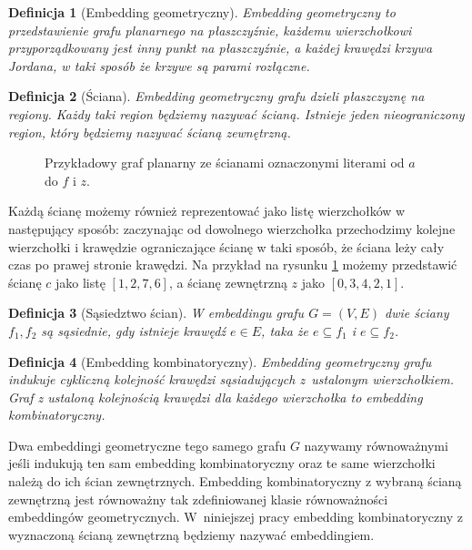 \documentclass[twoside,a4paper,12pt]{report} %
\theoremstyle{break}
\newtheorem{definition}{Definicja}[section]
\begin{document}
\begin{definition}[Embedding geometryczny]
\emph{Embedding geometryczny} to przedstawienie grafu planarnego na płaszczyźnie, każdemu wierzchołkowi przyporządkowany jest inny punkt na płaszczyźnie, a każdej krawędzi krzywa Jordana, w taki sposób że krzywe są parami rozłączne.
\end{definition}

\begin{definition}[Ściana]
Embedding geometryczny grafu dzieli płaszczyznę na regiony. Każdy taki region będziemy nazywać \emph{ścianą}. Istnieje jeden nieograniczony region, który będziemy nazywać ścianą zewnętrzną.
\end{definition}

\begin{figure}[ht]
\begin{center}
    
\end{center}
\caption{Przykładowy graf planarny ze ścianami oznaczonymi literami od $a$ do $f$ i $z$.}
\label{sciany}
\end{figure}

Każdą ścianę możemy również reprezentować jako listę wierzchołków w następujący sposób: zaczynając od dowolnego wierzchołka przechodzimy kolejne wierzchołki i krawędzie ograniczające ścianę w taki sposób, że ściana leży cały czas po prawej stronie krawędzi. Na przykład na rysunku \ref{sciany} możemy przedstawić ścianę $c$ jako listę $[1,2,7,6]$, a ścianę zewnętrzną $z$ jako $[0,3,4,2,1]$.

\begin{definition}[Sąsiedztwo ścian]
W embeddingu grafu $G=(V,E)$ dwie ściany $f_1, f_2$ są \emph{sąsiednie}, gdy istnieje krawędź $e \in E$, taka że $e \subseteq f_1$ i $e \subseteq f_2$. 
\end{definition}

\begin{definition}[Embedding kombinatoryczny]
Embedding geometryczny grafu indukuje cykliczną kolejność krawędzi sąsiadujących z~ustalonym wierzchołkiem. Graf z ustaloną kolejnością krawędzi dla każdego wierzchołka to \emph{embedding kombinatoryczny}.
\end{definition}

Dwa embeddingi geometryczne tego samego grafu $G$ nazywamy równoważnymi jeśli indukują ten sam embedding kombinatoryczny oraz te same wierzchołki należą do ich ścian zewnętrznych. Embedding kombinatoryczny z wybraną ścianą zewnętrzną jest równoważny tak zdefiniowanej klasie równoważności embeddingów geometrycznych. W~niniejszej pracy embedding kombinatoryczny z wyznaczoną ścianą zewnętrzną będziemy nazywać embeddingiem.
\end{document}
